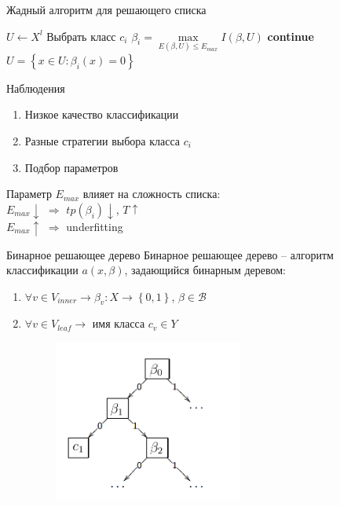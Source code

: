 \documentclass[10pt]{beamer}
\begin{document}
\begin{frame}{Жадный алгоритм для решающего списка}
  \begin{algorithmic}[1]
      \State $U \gets X^l$
	      \State Выбрать класс $c_i$
	      \State $\beta_i = \max\limits_{E(\beta, U) \leq E_{max}} I(\beta, U)$
	        \State \textbf{continue}
	      \EndIf
	      \State $U = \left\{ x \in U: \beta_i(x) = 0 \right\}$
	        \Return
	      \EndIf
      \EndFor
    \EndFunction
  \end{algorithmic}    
\end{frame}

\begin{frame}{Наблюдения}
	\begin{enumerate}[--]
	\item Низкое качество классификации
	\item Разные стратегии выбора класса $c_i$
	\item Подбор параметров
	\end{enumerate}
	\bigbreak
	\pause
	Параметр $E_{max}$ влияет на сложность списка:\\
	$E_{max} \downarrow$ $\Rightarrow$ $tp(\beta_i) \downarrow$, $T \uparrow$\\
	$E_{max} \uparrow$ $\Rightarrow$ underfitting
\end{frame}


\begin{frame}{Бинарное решающее дерево}
	Бинарное решающее дерево -- алгоритм классификации $a(x, \beta)$, задающийся бинарным деревом:\\
	\begin{enumerate}[--]
	\item $\forall v \in V_{inner} \rightarrow \beta_v: X \rightarrow \left\{ 0,1\right\}$, $\beta \in \mathscr{B}$
	\item $\forall v \in V_{leaf} \rightarrow $ имя класса $c_v \in Y$\\
	
	\begin{figure}[htbp]
	  \includegraphics[height=150pt, keepaspectratio = true]{images/binary_tree}   
	\end{figure}
	\end{enumerate}
\end{frame}
\end{document}
